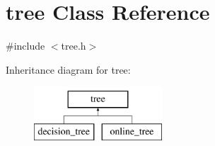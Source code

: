\hypertarget{classtree}{\section{tree Class Reference}
\label{classtree}
}


{\ttfamily \#include $<$tree.\+h$>$}

Inheritance diagram for tree\+:\begin{figure}[H]
\begin{center}
\leavevmode
\includegraphics[height=2.000000cm]{classtree}
\end{center}
\end{figure}
